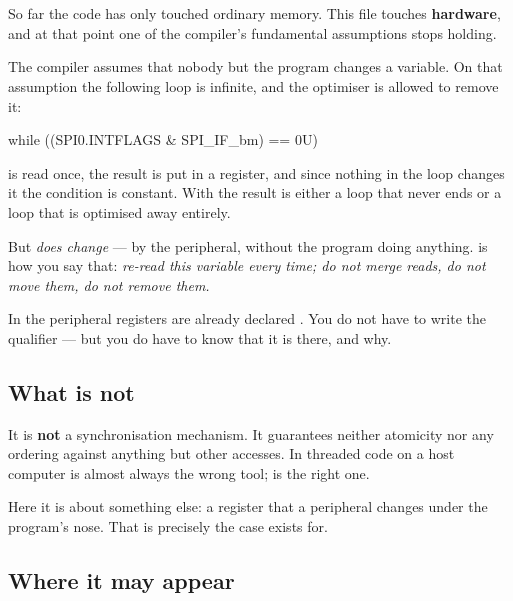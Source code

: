 \section{\texorpdfstring{}{volatile}}
\label{sec:volatile}

So far the code has only touched ordinary memory. This file touches \textbf{hardware}, and at that
point one of the compiler's fundamental assumptions stops holding.

The compiler assumes that nobody but the program changes a variable. On that assumption the
following loop is infinite, and the optimiser is allowed to remove it:

\begin{cppcode}
while ((SPI0.INTFLAGS & SPI_IF_bm) == 0U)
{
}
\end{cppcode}

 is read once, the result is put in a register, and since nothing in the loop
changes it the condition is constant. With  the result is either a loop that never ends
or a loop that is optimised away entirely.

But  \emph{does change} --- by the peripheral, without the program doing anything.
 is how you say that: \emph{re-read this variable every time; do not merge reads, do
not move them, do not remove them.}

In  the peripheral registers are already declared . You do not have
to write the qualifier --- but you do have to know that it is there, and why.

\subsection{What \texorpdfstring{}{volatile} is not}

It is \textbf{not} a synchronisation mechanism. It guarantees neither atomicity nor any ordering
against anything but other  accesses. In threaded code on a host computer
 is almost always the wrong tool;  is the right one.

Here it is about something else: a register that a peripheral changes under the program's nose.
That is precisely the case  exists for.

\subsection{Where it may appear}

